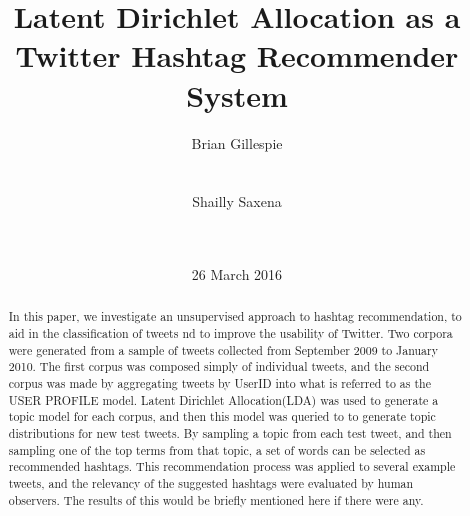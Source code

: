 \documentclass{acm_proc_article-sp}
\begin{document}
\title{Latent Dirichlet Allocation as a Twitter Hashtag Recommender System
	}



\author{
\alignauthor
Brian Gillespie\\
       \\
       \\
\alignauthor
Shailly Saxena\\
       \\
       \\
}

\date{26 March 2016}



\maketitle
\begin{abstract}
\hspace*{5mm}In this paper, we investigate an unsupervised approach to hashtag recommendation, to aid in the classification of tweets nd to improve the usability of Twitter. Two corpora were generated from a sample of tweets collected from September 2009 to January 2010. The first corpus was composed simply of individual tweets, and the second corpus was made by aggregating tweets by UserID into what is referred to as the USER PROFILE model. Latent Dirichlet Allocation(LDA) was used to generate a topic model for each corpus, and then this model was queried to to generate topic distributions for new test tweets. By sampling a topic from each test tweet, and then sampling one of the top terms from that topic, a set of words can be selected as recommended hashtags. This recommendation process was applied to several example tweets, and the relevancy of the suggested hashtags were evaluated by human observers. The results of this would be briefly mentioned here if there were any.
\end{abstract}

\end{document}
